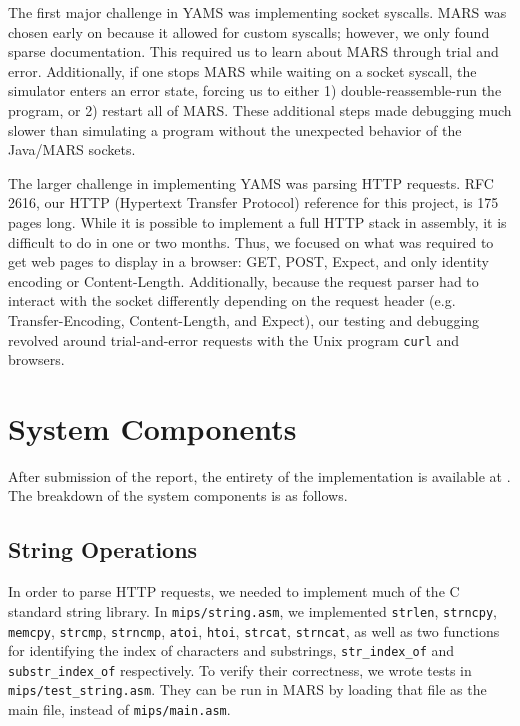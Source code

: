 \documentclass[journal,10pt]{IEEEtran}
\begin{document}
The first major challenge in YAMS was implementing socket syscalls. MARS was
chosen early on because it allowed for custom syscalls; however, we only found
sparse documentation. This required us to learn about MARS through trial and
error. Additionally, if one stops MARS while waiting on a socket syscall, the
simulator enters an error state, forcing us to either 1) double-reassemble-run
the program, or 2) restart all of MARS. These additional steps made debugging
much slower than simulating a program without the unexpected behavior of the
Java/MARS sockets.

The larger challenge in implementing YAMS was parsing HTTP requests. RFC
2616\cite{Leach}, our HTTP (Hypertext Transfer Protocol) reference for this
project, is 175 pages long. While it is possible to implement a full HTTP stack
in assembly, it is difficult to do in one or two months. Thus, we focused on
what was required to get web pages to display in a browser: GET, POST, Expect,
and only identity encoding or Content-Length. Additionally, because the request
parser had to interact with the socket differently depending on the request
header (e.g. Transfer-Encoding, Content-Length, and Expect), our testing and
debugging revolved around trial-and-error requests with the Unix program
\texttt{curl} and browsers.

\section{System Components}

After submission of the report, the entirety of the implementation is available at \cite{Brennan}. The breakdown of the system components is as follows.

\subsection{String Operations}

In order to parse HTTP requests, we needed to implement much of the C standard
string library. In \texttt{mips/string.asm}, we implemented \texttt{strlen},
\texttt{strncpy}, \texttt{memcpy}, \texttt{strcmp}, \texttt{strncmp},
\texttt{atoi}, \texttt{htoi}, \texttt{strcat}, \texttt{strncat}, as well as two
functions for identifying the index of characters and substrings,
\texttt{str\_index\_of} and \texttt{substr\_index\_of} respectively. To verify
their correctness, we wrote tests in \texttt{mips/test\_string.asm}. They can
be run in MARS by loading that file as the main file, instead of
\texttt{mips/main.asm}.
\end{document}
